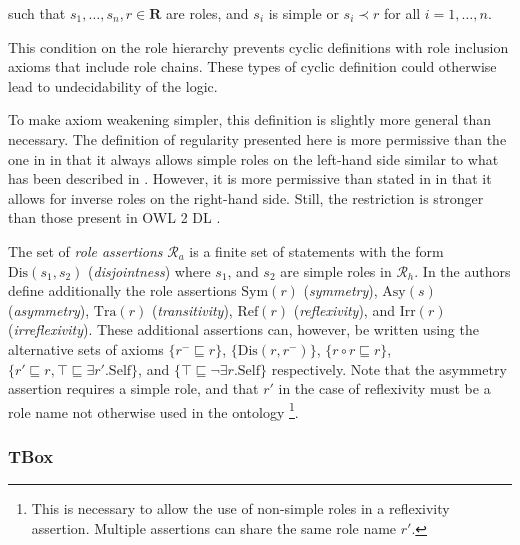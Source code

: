 such that $s_1, \dots, s_n, r \in \mathbf{R}$ are roles, and $s_i$ is simple or $s_i \prec r$ for all $i = 1, \dots, n$.

This condition on the role hierarchy prevents cyclic definitions with role inclusion axioms that include role chains. These types of cyclic definition could otherwise lead to undecidability of the logic.

\begin{example}
\end{example}

\begin{example}
\end{example}

To make axiom weakening simpler, this definition is slightly more general than necessary. The definition of regularity presented here is more permissive than the one in \cite{horrocks2006even} in that it always allows simple roles on the left-hand side similar to what has been described in \cite{rudolph2011foundations}. However, it is more permissive than stated in \cite{rudolph2011foundations} in that it allows for inverse roles on the right-hand side. Still, the restriction is stronger than those present in OWL 2 DL \cite{motik2009owl_spec}.

The set of \emph{role assertions} $\mathcal{R}_a$ is a finite set of statements with the form $\mathrm{Dis}(s_1, s_2)$ (\emph{disjointness}) where $s_1$, and $s_2$ are simple roles in $\mathcal{R}_h$. In \cite{horrocks2006even} the authors define additionally the role assertions $\mathrm{Sym}(r)$ (\emph{symmetry}), $\mathrm{Asy}(s)$ (\emph{asymmetry}), $\mathrm{Tra}(r)$ (\emph{transitivity}), $\mathrm{Ref}(r)$ (\emph{reflexivity}), and $\mathrm{Irr}(r)$ (\emph{irreflexivity}). These additional assertions can, however, be written using the alternative sets of axioms $\{ r^- \sqsubseteq r \}$, $\{ \mathrm{Dis}(r, r^-) \}$, $\{ r \circ r \sqsubseteq r \}$, $\{ r' \sqsubseteq r , \top \sqsubseteq \exists r'. \mathrm{Self} \}$, and $\{ \top \sqsubseteq \lnot \exists r . \mathrm{Self} \}$ respectively. Note that the asymmetry assertion requires a simple role, and that $r'$ in the case of reflexivity must be a role name not otherwise used in the ontology \footnote{This is necessary to allow the use of non-simple roles in a reflexivity assertion. Multiple assertions can share the same role name $r'$.}.

\subsubsection{TBox} \label{tbox}

